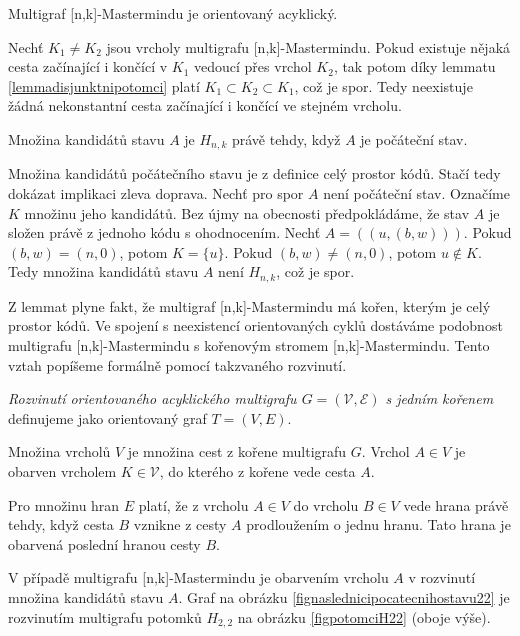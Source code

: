 \begin{lemma}
    Multigraf [n,k]-Mastermindu je orientovaný acyklický. 
\end{lemma}
\begin{dukaz}
    Nechť $K_1 \neq K_2$ jsou vrcholy multigrafu [n,k]-Mastermindu. 
    Pokud existuje nějaká cesta začínající i končící v $K_1$ vedoucí přes vrchol $K_2$, tak potom díky lemmatu \ref{lemmadisjunktnipotomci} platí $K_1 \subset K_2 \subset K_1$, což je spor. Tedy neexistuje žádná nekonstantní cesta začínající i končící ve stejném vrcholu.
\end{dukaz}

\begin{lemma}\label{lemmakandidatipocstavu}
    Množina kandidátů stavu $A$ je $H_{n,k}$ právě tehdy, když $A$ je počáteční stav.
\end{lemma}
\begin{dukaz}
    Množina kandidátů počátečního stavu je z definice celý prostor kódů. Stačí tedy dokázat implikaci zleva doprava. Nechť pro spor $A$ není počáteční stav. Označíme $K$ množinu jeho kandidátů. Bez újmy na obecnosti předpokládáme, že stav $A$ je složen právě z jednoho kódu s ohodnocením. Nechť $A = ((u, (b,w)))$. Pokud $(b,w) = (n,0)$, potom $K = \{u\}$. Pokud $(b,w) \neq (n,0)$, potom $u \notin K$. Tedy množina kandidátů stavu $A$ není $H_{n,k}$, což je spor. 
\end{dukaz}

Z lemmat plyne fakt, že multigraf [n,k]-Mastermindu má kořen, kterým je celý prostor kódů. Ve spojení s neexistencí orientovaných cyklů dostáváme podobnost multigrafu [n,k]-Mastermindu s kořenovým stromem [n,k]-Mastermindu. Tento vztah popíšeme formálně pomocí takzvaného rozvinutí.
\begin{definice}
    \emph{Rozvinutí orientovaného acyklického multigrafu $G = (\mathcal{V}, \mathcal{E})$ s jedním kořenem} definujeme jako orientovaný graf $T = (V, E)$.
    
    Množina vrcholů $V$ je množina cest z kořene multigrafu $G$. Vrchol $A \in V$ je obarven vrcholem $K \in \mathcal{V}$, do kterého z kořene vede cesta $A$. 
    
    Pro množinu hran $E$ platí, že z vrcholu $A \in V$ do vrcholu $B \in V$ vede hrana právě tehdy, když cesta $B$ vznikne z cesty $A$ prodloužením o jednu hranu. Tato hrana je obarvená poslední hranou cesty $B$. 
\end{definice}
V případě multigrafu [n,k]-Mastermindu je obarvením vrcholu $A$ v rozvinutí množina kandidátů stavu $A$. Graf na obrázku \ref{fignaslednicipocatecnihostavu22} je rozvinutím multigrafu potomků $H_{2,2}$ na obrázku \ref{figpotomciH22} (oboje výše).


